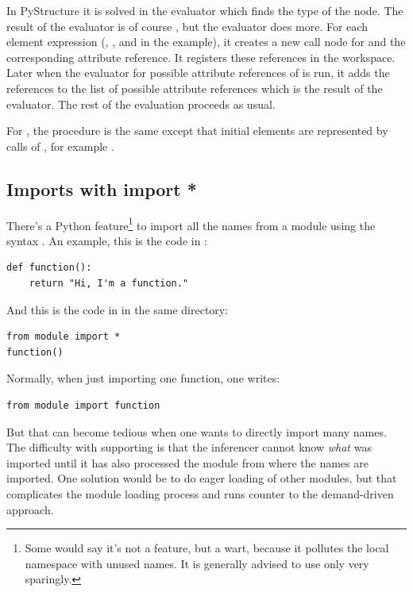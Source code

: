 \documentclass[12pt,halfparskip,DIV11,BCOR10mm]{scrreprt}
\begin{document}
In PyStructure it is solved in the evaluator which finds the type of the  node. The result of the evaluator is of course , but the evaluator does more. For each element expression (, ,  and  in the example), it creates a new call node for  and the corresponding attribute reference. It registers these references in the workspace. Later when the evaluator for possible attribute references of  is run, it adds the references to the list of possible attribute references which is the result of the evaluator. The rest of the evaluation proceeds as usual.

For , the procedure is the same except that initial elements are represented by calls of , for example .

\subsection{Imports with import *}\label{import_star}

There's a Python feature\footnote{Some would say it's not a feature, but a wart, because it pollutes the local namespace with unused names. It is generally advised to use  only very sparingly.} to import all the names from a module using the syntax . An example, this is the code in :

\begin{lstlisting}
def function():
    return "Hi, I'm a function."
\end{lstlisting}

And this is the code in  in the same directory:

\begin{lstlisting}
from module import *
function()
\end{lstlisting}

Normally, when just importing one function, one writes:

\begin{lstlisting}
from module import function
\end{lstlisting}

But that can become tedious when one wants to directly import many names. The difficulty with supporting  is that the inferencer cannot know \emph{what} was imported until it has also processed the module from where the names are imported. One solution would be to do eager loading of other modules, but that complicates the module loading process and runs counter to the demand-driven approach.
\end{document}
